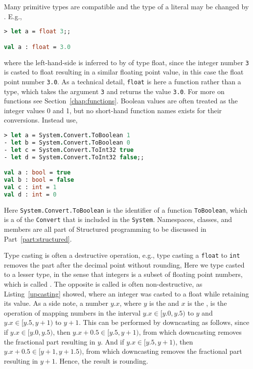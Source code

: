 Many primitive types are compatible and the type of a literal may be changed by . E.g.,
%
\begin{lstlisting}[language=fsharp,caption={fsharpi, casting an integer to a floating point number.},label=upcasting]
> let a = float 3;;

val a : float = 3.0
\end{lstlisting}
where the left-hand-side is inferred to by of type float, since the integer number \lstinline|3| is casted to float resulting in a similar floating point value, in this case the float point number \lstinline|3.0|. As a technical detail, \lstinline|float| is here a function rather than a type, which takes the argument \lstinline|3| and returns the value \lstinline|3.0|.  For more on functions see Section~\ref{chap:functions}. Boolean values are often treated as the integer values 0 and 1, but no short-hand function names exists for their conversions. Instead use,
%
\begin{lstlisting}[language=fsharp,caption={fsharpi, casting booleans.}]
> let a = System.Convert.ToBoolean 1    
- let b = System.Convert.ToBoolean 0    
- let c = System.Convert.ToInt32 true   
- let d = System.Convert.ToInt32 false;;

val a : bool = true
val b : bool = false
val c : int = 1
val d : int = 0
\end{lstlisting}
Here \lstinline|System.Convert.ToBoolean| is the identifier of a function \lstinline|ToBoolean|, which is a  of the  \lstinline|Convert| that is included in the  \lstinline|System|. Namespaces, classes, and members are all part of Structured programming to be discussed in Part~\ref{part:structured}.

Type casting is often a destructive operation, e.g., type casting a \lstinline{float} to \lstinline{int} removes the part after the decimal point without rounding,
%
%
Here we type casted to a lesser type, in the sense that integers is a subset of floating point numbers, which is called . The opposite is called  is often non-destructive, as Listing~\ref{upcasting} showed, where an integer was casted to a float while retaining its value. As a side note,  a number $y.x$, where $y$ is the  and $x$ is the , is the operation of mapping numbers in the interval $y.x \in [y.0,y.5)$ to $y$ and $y.x\in [y.5,y+1)$ to $y+1$. This can be performed by downcasting as follows,
%
%
since if $y.x\in [y.0, y.5)$, then $y.x+0.5\in [y.5, y+1)$, from which downcasting removes the fractional part resulting in $y$. And if $y.x\in [y.5, y+1)$, then $y.x+0.5\in [y+1,y+1.5)$, from which downcasting removes the fractional part resulting in $y+1$. Hence, the result is rounding. 

